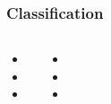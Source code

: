 \begin{frame}
	\frametitle{Classification}
	
	\begin{columns}[c]
		
		
		\begin{itemize}
			\item 
			\item 
			\item 
		\end{itemize}
		
		
		\begin{itemize}
			\item 
			\item 
			\item 
		\end{itemize}	
		
	\end{columns}
	
\end{frame}

